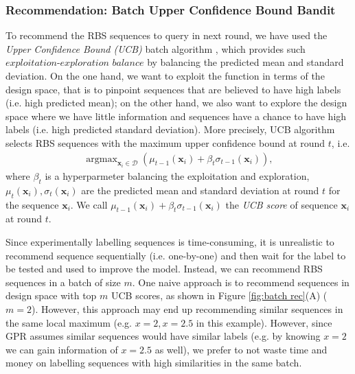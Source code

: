 \subsubsection{Recommendation: Batch Upper Confidence Bound Bandit}

To recommend the RBS sequences to query in next round, we have used the \textit{Upper Confidence Bound (UCB)} batch algorithm \cite{srinivas2012information}, which provides such $\textit{exploitation-exploration balance}$ by balancing the predicted mean and standard deviation.
On the one hand, we want to exploit the function in terms of the design space, that is to pinpoint sequences that are believed to have high labels (i.e. high predicted mean); 
on the other hand, we also want to explore the design space where we have little information and sequences have a chance to have high labels (i.e. high predicted standard deviation).
More precisely, UCB algorithm selects RBS sequences with the maximum upper confidence bound at round $t$, i.e.
\begin{align}
\label{Eq: GPUCB}
    \operatorname{argmax}_{\mathbf{x}_i \in \mathcal{D}} \left( \mu_{t-1}(\mathbf{x}_i) + \beta_t \sigma_{t-1}(\mathbf{x}_i)\right),
\end{align}
where $\beta_t$ is a hyperparmeter balancing the exploitation and exploration, 
$\mu_t(\mathbf{x}_i), \sigma_t(\mathbf{x}_i)$ are the predicted mean and standard deviation at round $t$ for the sequence $\mathbf{x}_i$.
We call $\mu_{t-1}(\mathbf{x}_i) + \beta_t \sigma_{t-1}(\mathbf{x}_i)$ the \textit{UCB score} of sequence $\mathbf{x}_i$ at round $t$.

Since experimentally labelling sequences is time-consuming, it is unrealistic to recommend sequence sequentially (i.e. one-by-one) and then wait for the label to be tested and used to improve the model.
Instead, we can recommend RBS sequences in a batch of size $m$. 
One naive approach is to 
recommend sequences in design space with top $m$ UCB scores, as shown in Figure \ref{fig:batch rec}(A) ($m = 2$).
However, this approach may end up recommending similar sequences in the same local maximum (e.g. $x = 2, x =2.5$ in this example). 
However, since GPR assumes similar sequences would have similar labels (e.g. by knowing $x=2$ we can gain information of $x=2.5$ as well), we prefer to not waste time and money on labelling sequences with high similarities in the same batch.

